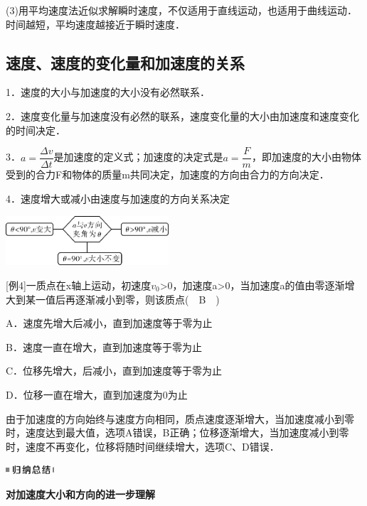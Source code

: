 (3)用平均速度法近似求解瞬时速度，不仅适用于直线运动，也适用于曲线运动．时间越短，平均速度越接近于瞬时速度．

\newpage
\subsection{速度、速度的变化量和加速度的关系}

1．速度的大小与加速度的大小没有必然联系．

2．速度变化量与加速度没有必然的联系，速度变化量的大小由加速度和速度变化的时间决定．

3．$a=\dfrac{\Delta v}{\Delta t}$是加速度的定义式；加速度的决定式是$a=\dfrac{F}{m}$，即加速度的大小由物体受到的合力F和物体的质量m共同决定，加速度的方向由合力的方向决定．

4．速度增大或减小由速度与加速度的方向关系决定

\begin{center}\includegraphics[width=2.38542in,height=0.72917in]{media/image15.png}\end{center}

{[}例4{]}一质点在x轴上运动，初速度$v_0$\textgreater0，加速度a\textgreater0，当加速度a的值由零逐渐增大到某一值后再逐渐减小到零，则该质点(　B　)

A．速度先增大后减小，直到加速度等于零为止

B．速度一直在增大，直到加速度等于零为止

C．位移先增大，后减小，直到加速度等于零为止

D．位移一直在增大，直到加速度为0为止

\begin{solution}
	由于加速度的方向始终与速度方向相同，质点速度逐渐增大，当加速度减小到零时，速度达到最大值，选项A错误，B正确；位移逐渐增大，当加速度减小到零时，速度不再变化，位移将随时间继续增大，选项C、D错误．
\end{solution}


\begin{center}\includegraphics[width=0.70833in,height=0.125in]{media/image13.png}

\textbf{对加速度大小和方向的进一步理解}
\end{center}


